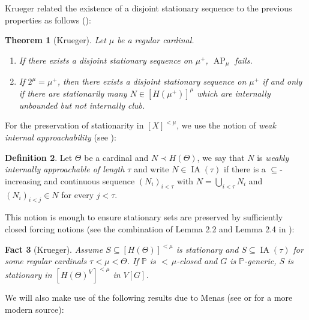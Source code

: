 \documentclass[a4paper]{amsart}
\theoremstyle{definition}
\newtheorem{mydef}{Definition}[section]
\theoremstyle{remark}
\theoremstyle{plain}
\newtheorem{mysen}[mydef]{Theorem}
\newtheorem{myfact}[mydef]{Fact}
\numberwithin{mydef}{section}
\DeclareMathOperator{\AP}{AP}
\DeclareMathOperator{\IA}{IA}
\newcommand{\dP}{\mathbb{P}}
\begin{document}
	Krueger related the existence of a disjoint stationary sequence to the previous properties as follows (\cite[Corollary 3.7, Theorem 6.5]{KruegerApplicMSI}):
	
	\begin{mysen}[Krueger]\label{KruegerThm}
		Let $\mu$ be a regular cardinal.
		\begin{enumerate}
			\item If there exists a disjoint stationary sequence on $\mu^+$, $\AP_{\mu}$ fails.
			\item If $2^{\mu}=\mu^+$, then there exists a disjoint stationary sequence on $\mu^+$ if and only if there are stationarily many $N\in[H(\mu^+)]^{\mu}$ which are internally unbounded but not internally club.
		\end{enumerate}
	\end{mysen}
	
	For the preservation of stationarity in $[X]^{<\mu}$, we use the notion of \emph{weak internal approachability} (see \cite[Definition 2.1]{ForemanMagidorLCCounterexamples}):
	
	\begin{mydef}
		Let $\Theta$ be a cardinal and $N\prec H(\Theta)$, we say that $N$ is \emph{weakly internally approachable of length $\tau$} and write $N\in\IA(\tau)$ if there is a $\subseteq$-increasing and continuous sequence $(N_i)_{i<\tau}$ with $N=\bigcup_{i<\tau}N_i$ and $(N_i)_{i<j}\in N$ for every $j<\tau$.
	\end{mydef}
	
	This notion is enough to ensure stationary sets are preserved by sufficiently closed forcing notions (see the combination of Lemma 2.2 and Lemma 2.4 in \cite{KruegerApplicMSI}):
	
	\begin{myfact}[Krueger]\label{FactKrueger2}
		Assume $S\subseteq[H(\Theta)]^{<\mu}$ is stationary and $S\subseteq\IA(\tau)$ for some regular cardinals $\tau<\mu<\Theta$. If $\dP$ is ${<}\,\mu$-closed and $G$ is $\dP$-generic, $S$ is stationary in $[H(\Theta)^V]^{<\mu}$ in $V[G]$.
	\end{myfact}
	
	We will also make use of the following results due to Menas (see \cite{MenasStrongCSuperC} or \cite[Lemma 8.26, Theorem 8.27]{JechSetTheory} for a more modern source):
	
\end{document}
